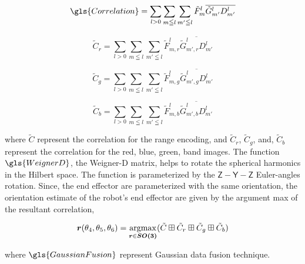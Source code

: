 \begin{equation}\label{eq:fourier_correlation_red}
  \gls{Correlation} = \sum_{l > 0} \sum_{m \leqq l} \sum_{m' \leqq l}
  \tilde{F}^l_{m} \overline{\tilde{G}^l_{m'} D^l_{m'}}
\end{equation}

\begin{equation}\label{eq:fourier_correlation_red}
  \tilde{C}_r = \sum_{l > 0} \sum_{m \leqq l} \sum_{m' \leqq l}
  \tilde{F}^l_{m,r} \overline{\tilde{G}^l_{m',r} D^l_{m'}}
\end{equation}

\begin{equation}\label{eq:fourier_correlation_green}
  \tilde{C}_g = \sum_{l > 0} \sum_{m \leqq l} \sum_{m' \leqq l}
  \tilde{F}^l_{m,g} \overline{\tilde{G}^l_{m',g} D^l_{m'}}
\end{equation}

\begin{equation}\label{eq:fourier_correlation_blue}
  \tilde{C}_b = \sum_{l > 0} \sum_{m \leqq l} \sum_{m' \leqq l}
  \tilde{F}^l_{m,b} \overline{\tilde{G}^l_{m',b} D^l_{m'}}
\end{equation}

where $\tilde{C}$ represent the correlation for the range encoding,
and $\tilde{C}_r$, $\tilde{C}_g$, and, $\tilde{C}_b$ represent the correlation
for the
red, blue, green, band images. The function $\gls{WeignerD}$, the Weigner-D 
matrix, helps to rotate the spherical harmonics in the Hilbert space. 
The function is parameterized by the $\mathsf{Z-Y-Z}$ Euler-angles rotation. 
Since, the end effector are parameterized with the same orientation, 
the orientation estimate of the robot's end effector are given by 
the argument max of the resultant correlation,

\begin{equation}
  \vb*{r}(\theta_4,\theta_5,\theta_6) = \operatorname*{argmax}\limits_{\vb*{r} \in \vb*{SO(3)}} 
   ( \tilde{C} \boxplus \tilde{C}_r \boxplus \tilde{C}_g \boxplus \tilde{C}_b )
\end{equation}


where $\gls{GaussianFusion}$ represent Gaussian data fusion technique. 
